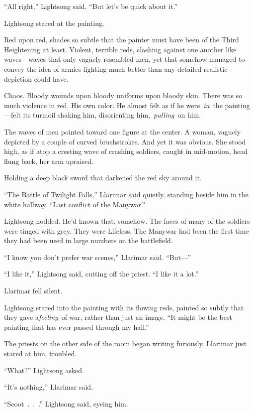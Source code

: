 “All right,” Lightsong said. “But let’s be quick about it.”

\orn

Lightsong stared at the painting.

Red upon red, shades so subtle that the painter must have been of the Third Heightening at least. Violent, terrible reds, clashing against one another like waves—waves that only vaguely resembled men, yet that somehow managed to convey the idea of armies fighting much better than any detailed realistic depiction could have.

Chaos. Bloody wounds upon bloody uniforms upon bloody skin. There was so much violence in red. His own color. He almost felt as if he were~\textit{in}~the painting—felt its turmoil shaking him, disorienting him,~\textit{pulling}~on him.

The waves of men pointed toward one figure at the center. A woman, vaguely depicted by a couple of curved brushstrokes. And yet it was obvious. She stood high, as if atop a cresting wave of crashing soldiers, caught in mid-motion, head flung back, her arm upraised.

Holding a deep black sword that darkened the red sky around it.

“The Battle of Twilight Falls,” Llarimar said quietly, standing beside him in the white hallway. “Last conflict of the Manywar.”

Lightsong nodded. He’d known that, somehow. The faces of many of the soldiers were tinged with grey. They were Lifeless. The Manywar had been the first time they had been used in large numbers on the battlefield.

“I know you don’t prefer war scenes,” Llarimar said. “But—”

“I like it,” Lightsong said, cutting off the priest. “I like it a lot.”

Llarimar fell silent.

Lightsong stared into the painting with its flowing reds, painted so subtly that they gave a\textit{feeling}~of war, rather than just an image. “It might be the best painting that has ever passed through my hall.”

The priests on the other side of the room began writing furiously. Llarimar just stared at him, troubled.

“What?” Lightsong asked.

“It’s nothing,” Llarimar said.

“Scoot~.~.~.” Lightsong said, eyeing him.


